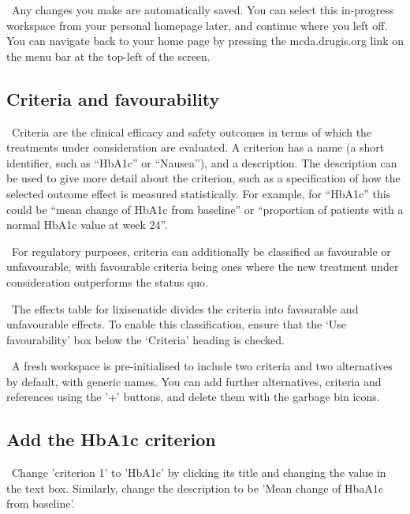 \documentclass[00_mcda_tutorial.tex]{subfiles}
\begin{document}
\noindent \faLightbulbO \, Any changes you make are automatically saved. You can select this in-progress workspace from your personal homepage later, and continue where you left off. You can navigate back to your home page by pressing the mcda.drugis.org link on the menu bar at the top-left of the screen.

\subsection*{Criteria and favourability}

\noindent \faGraduationCap \, Criteria are the clinical efficacy and safety outcomes in terms of which the treatments under consideration are evaluated. A criterion has a name (a short identifier, such as  “HbA1c” or “Nausea”), and a description. The description can be used to give more detail about the criterion, such as a specification of how the selected outcome effect is measured statistically. For example, for “HbA1c” this could be “mean change of HbA1c from baseline” or “proportion of patients with a normal HbA1c value at week 24”.
\newline

\noindent \faGraduationCap \, For regulatory purposes, criteria can additionally be classified as favourable or unfavourable, with favourable criteria being ones where the new treatment under consideration outperforms the status quo.
\newline


\noindent \leftpointright \, The effects table for lixisenatide divides the criteria into favourable and unfavourable effects. To enable this classification, ensure that the ‘Use favourability’ box below the ‘Criteria’ heading is checked.
\newline

\noindent \faGraduationCap \, A fresh workspace is pre-initialised to include two criteria and two alternatives by default, with generic names. You can add further alternatives, criteria and references using the '+' buttons, and delete them with the garbage bin icons.

\subsection*{Add the HbA1c criterion}
\noindent \leftpointright \, Change 'criterion 1' to 'HbA1c' by clicking its title and changing the value in the text box. Similarly, change the description to be 'Mean change of HbaA1c from baseline'.
\end{document}
